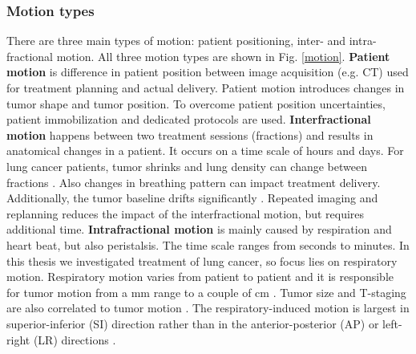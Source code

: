 \newpage




\subsubsection{Motion types}

There are three main types of motion: patient positioning, inter- and intra-fractional motion. All three motion types are shown in Fig. \ref{motion}.
\newline
\textbf{Patient motion} is difference in patient position between image acquisition (e.g. CT) used for treatment planning and actual delivery. Patient motion introduces changes in tumor shape and tumor position. To overcome patient 
position uncertainties, patient immobilization and dedicated protocols are used.
\newline
\textbf{Interfractional motion} happens between two treatment sessions (fractions) and results in anatomical changes in a patient. It occurs on a time scale of hours and days. For lung cancer patients, tumor shrinks and lung density can change between fractions \cite{Mori2009}. 
Also changes in breathing pattern can impact treatment delivery. Additionally, the tumor baseline drifts significantly \cite{Sonke2008}. Repeated imaging and replanning reduces the impact of the interfractional motion, but requires additional time.
\newline
\textbf{Intrafractional motion} is mainly caused by respiration and heart beat, but also peristalsis. The time scale ranges from seconds to minutes. In this thesis we investigated treatment of lung cancer, so focus lies on respiratory motion. Respiratory motion varies from patient to patient and 
it is responsible for tumor motion from a mm range to a couple of cm \cite{Shirato2004a}. Tumor size and T-staging are also correlated to tumor motion \cite{Liu2007}. The respiratory-induced motion is largest in superior-inferior (SI) direction rather than 
in the anterior-posterior (AP) or left-right (LR) directions \cite{Seppenwoolde2002, Britton2007, Liu2007}.

\newpage

